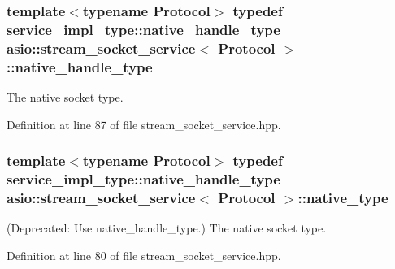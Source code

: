 \hypertarget{classasio_1_1stream__socket__service_a357418641fad207a19bade585d086876}{}
\subsubsection[{native\+\_\+handle\+\_\+type}]{\setlength{\rightskip}{0pt plus 5cm}template$<$typename Protocol$>$ typedef {\bf service\+\_\+impl\+\_\+type\+::native\+\_\+handle\+\_\+type} {\bf asio\+::stream\+\_\+socket\+\_\+service}$<$ Protocol $>$\+::{\bf native\+\_\+handle\+\_\+type}}\label{classasio_1_1stream__socket__service_a357418641fad207a19bade585d086876}


The native socket type. 



Definition at line 87 of file stream\+\_\+socket\+\_\+service.\+hpp.

\hypertarget{classasio_1_1stream__socket__service_a26842938d909788add79ee91c2e6146c}{}
\subsubsection[{native\+\_\+type}]{\setlength{\rightskip}{0pt plus 5cm}template$<$typename Protocol$>$ typedef {\bf service\+\_\+impl\+\_\+type\+::native\+\_\+handle\+\_\+type} {\bf asio\+::stream\+\_\+socket\+\_\+service}$<$ Protocol $>$\+::{\bf native\+\_\+type}}\label{classasio_1_1stream__socket__service_a26842938d909788add79ee91c2e6146c}


(Deprecated\+: Use native\+\_\+handle\+\_\+type.) The native socket type. 



Definition at line 80 of file stream\+\_\+socket\+\_\+service.\+hpp.

\hypertarget{classasio_1_1stream__socket__service_ab2ab14d6b8097da11777751e3164ec92}{}
